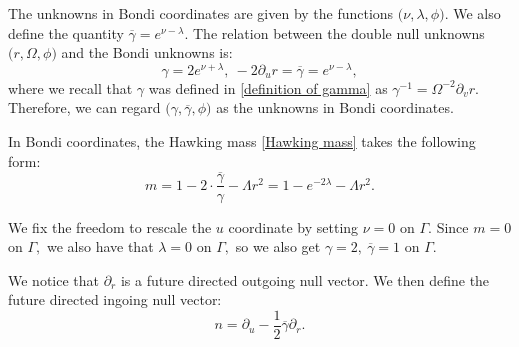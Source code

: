 \documentclass[11pt]{article}
\numberwithin{equation}{section}
\begin{document}
The unknowns in Bondi coordinates are given by the functions $\big(\nu,\lambda,\phi\big).$ We also define the quantity $\overline{\gamma}=e^{\nu-\lambda}.$ The relation between the double null unknowns $\big(r,\Omega,\phi\big)$ and the Bondi unknowns is:
\begin{equation}
    \gamma=2e^{\nu+\lambda},\ -2\partial_ur=\overline{\gamma}=e^{\nu-\lambda},
\end{equation}
where we recall that $\gamma$ was defined in \eqref{definition of gamma} as $\gamma^{-1}=\Omega^{-2}\partial_vr.$ Therefore, we can regard $\big(\gamma,\overline{\gamma},\phi\big)$ as the unknowns in Bondi coordinates.

In Bondi coordinates, the Hawking mass \eqref{Hawking mass} takes the following form:
\begin{equation}\label{Hawking mass Bondi}
    m=1-2\cdot\frac{\overline{\gamma}}{\gamma}-\Lambda r^2=1-e^{-2\lambda}-\Lambda r^2.
\end{equation}

We fix the freedom to rescale the $u$ coordinate by setting $\nu=0$ on $\Gamma.$ Since $m=0$ on $\Gamma,$ we also have that $\lambda=0$ on $\Gamma,$ so we also get $\gamma=2,\ \overline{\gamma}=1$ on $\Gamma.$

We notice that $\partial_r$ is a future directed outgoing null vector. We then define the future directed ingoing null vector:
\begin{equation}\label{definition of n}
    n=\partial_u-\frac{1}{2}\overline{\gamma}\partial_r.
\end{equation}
\end{document}
